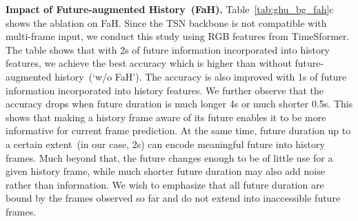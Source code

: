 \documentclass[10pt,twocolumn,letterpaper]{article}
\newcommand{\methodname}{GateHUB}
\begin{document}
 {\noindent \bf Impact of Future-augmented History~(FaH).}
Table~\ref{tab:ghu_bg_fah}c shows the ablation on FaH. Since the TSN backbone is not compatible with multi-frame input, we conduct this study using RGB features from TimeSformer. The table shows that with 2s of future information incorporated into history features, we achieve the best accuracy which is  higher than without future-augmented history~(`w/o FaH'). The accuracy is also improved with 1s of future information incorporated into history features. We further observe that the accuracy drops when future duration is much longer \eg 4s or much shorter \eg 0.5s. This shows that making a history frame aware of its future enables it to be more informative for current frame prediction. At the same time, future duration up to a certain extent~(in our case, 2s) can encode meaningful future into history frames. Much beyond that, the future changes enough to be of little use for a given history frame, while much shorter future duration may also add noise rather than information. We wish to emphasize that all future duration are bound by the frames observed so far and do not extend into inaccessible future frames.
\end{document}
